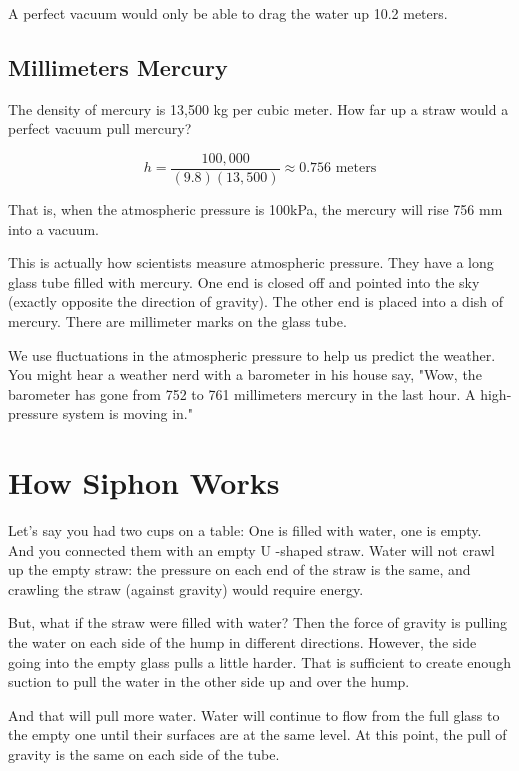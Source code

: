 A perfect vacuum would only be able to drag the water up 10.2 meters.

\subsection{Millimeters Mercury}

The density of mercury is 13,500 kg per cubic meter.  How far up a straw would a perfect vacuum pull mercury? 

$$h = \frac{100,000}{(9.8)(13,500)} \approx 0.756 \text{ meters}$$

That is, when the atmospheric pressure is 100kPa,  the mercury will rise 756 mm into a vacuum.

This is actually how scientists measure atmospheric pressure.   They have a long glass tube filled with mercury.  One end is closed off and pointed into the sky (exactly opposite the direction of gravity).  The other end is placed into a dish of mercury.  There are millimeter marks on the glass tube.

We use fluctuations in the atmospheric pressure to help us predict the weather.  You might hear a weather nerd with a barometer in his house say, "Wow, the barometer has gone from 752 to 761 millimeters mercury in the last hour.  A high-pressure system is moving in." 


\section{How Siphon Works}

Let's say you had two cups on a table: One is filled with water,  one is empty.  And you connected them with an empty U -shaped straw.  Water will not crawl up the empty straw:  the pressure on each end of the straw is the same, and crawling the straw (against gravity) would require energy.

But, what if the straw were filled with water?  Then the force of gravity is pulling the water on each side of the hump in different directions.   However,  the side going into the empty glass pulls a little harder.  That is sufficient to create enough suction to pull the  water in the other side up and over the hump.

And that will pull more water.    Water will continue to flow from the full glass to the empty one until their surfaces are at the same level.  At this point,  the pull of gravity is the same on each side of the tube.

